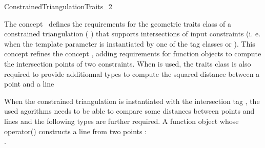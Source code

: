 

\begin{ccRefConcept}{ConstrainedTriangulationTraits_2}


\ccDefinition
  
The concept \ccRefName\ defines the requirements for the geometric
traits class of a constrained triangulation
( )
that supports intersections of input constraints (i. e.
when the template parameter  is instantiated
by one of the tag classes  or
). This concept refines the concept
, adding requirements for function objects
to compute the intersection points of two constraints.
When  is used, the 
traits class is
also required to provide  additionnal types
to compute the squared distance between a point and a line


\ccRefines
{} 


\ccTypes


When the constrained triangulation is instantiated with 
the intersection tag ,
the used agorithms needs to be able to compare some
distances between points and lines and the following
types are further required.
\ccGlue
{} {A function object whose operator()
constructs a line from two points : \\
.}
\ccGlue
{}



\end{ccRefConcept}
